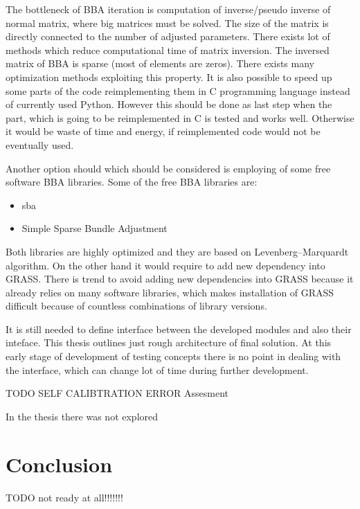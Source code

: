 \documentclass[a4paper,12pt]{article}
\begin{document}
The bottleneck of BBA iteration is computation of inverse/pseudo inverse of normal matrix, 
where big matrices must be solved. 
The size of the matrix is directly connected to the number of adjusted parameters. There exists  lot of methods which reduce computational 
time of matrix inversion. The inversed matrix of BBA is sparse (most of elements are zeros).
There exists many optimization methods exploiting this property. 
It is also possible to speed up some parts of the code reimplementing them in C programming language instead of currently used Python. However this should be done 
as last step when the part, which is going to be reimplemented in C is tested and works well. Otherwise it would be waste of time and energy, if reimplemented 
code would not be eventually used. 


Another option should which should  be considered is employing of some free software BBA libraries.
Some of the free BBA libraries are:
\begin{itemize}
\item sba
\item Simple Sparse Bundle Adjustment 
\end{itemize}

Both libraries are highly optimized and they are based on Levenberg–Marquardt algorithm.
On the other hand it would require to add new dependency into GRASS. 
There is trend to avoid adding new dependencies into GRASS because it already relies on many software libraries,
which makes installation of GRASS difficult because of countless combinations of library versions.

It is still needed to define interface between the developed modules and also their inteface. 
This thesis outlines just rough architecture of final solution. At this early stage of development of 
testing concepts
there is no point in dealing with the interface, which can change lot of time during further development.

TODO
SELF CALIBTRATION
ERROR Assesment

In the thesis there was not explored 


\section{Conclusion}

TODO not ready at all!!!!!!!
\end{document}
